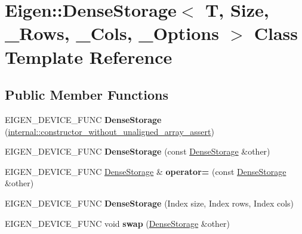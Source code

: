 \hypertarget{class_eigen_1_1_dense_storage}{}\section{Eigen\+::Dense\+Storage$<$ T, Size, \+\_\+\+Rows, \+\_\+\+Cols, \+\_\+\+Options $>$ Class Template Reference}
\label{class_eigen_1_1_dense_storage}
\subsection*{Public Member Functions}
\begin{DoxyCompactItemize}
\item 
\mbox{\label{class_eigen_1_1_dense_storage_a3ef428e5df9526e6a207ced6e8679e54}} 
E\+I\+G\+E\+N\+\_\+\+D\+E\+V\+I\+C\+E\+\_\+\+F\+U\+NC {\bfseries Dense\+Storage} (\mbox{\hyperlink{struct_eigen_1_1internal_1_1constructor__without__unaligned__array__assert}{internal\+::constructor\+\_\+without\+\_\+unaligned\+\_\+array\+\_\+assert}})
\item 
\mbox{\label{class_eigen_1_1_dense_storage_adfc3fa9ef776cb8406879c8f1a0c508d}} 
E\+I\+G\+E\+N\+\_\+\+D\+E\+V\+I\+C\+E\+\_\+\+F\+U\+NC {\bfseries Dense\+Storage} (const \mbox{\hyperlink{class_eigen_1_1_dense_storage}{Dense\+Storage}} \&other)
\item 
\mbox{\label{class_eigen_1_1_dense_storage_ab4f92e33490b8208b1f7efcf8c4d32bb}} 
E\+I\+G\+E\+N\+\_\+\+D\+E\+V\+I\+C\+E\+\_\+\+F\+U\+NC \mbox{\hyperlink{class_eigen_1_1_dense_storage}{Dense\+Storage}} \& {\bfseries operator=} (const \mbox{\hyperlink{class_eigen_1_1_dense_storage}{Dense\+Storage}} \&other)
\item 
\mbox{\label{class_eigen_1_1_dense_storage_aeff6f95d3021dd0990065a935919ac15}} 
E\+I\+G\+E\+N\+\_\+\+D\+E\+V\+I\+C\+E\+\_\+\+F\+U\+NC {\bfseries Dense\+Storage} (Index size, Index rows, Index cols)
\item 
\mbox{\label{class_eigen_1_1_dense_storage_aa962cfc93aeecafaf59744ac021289e7}} 
E\+I\+G\+E\+N\+\_\+\+D\+E\+V\+I\+C\+E\+\_\+\+F\+U\+NC void {\bfseries swap} (\mbox{\hyperlink{class_eigen_1_1_dense_storage}{Dense\+Storage}} \&other)

\end{DoxyCompactItemize}
